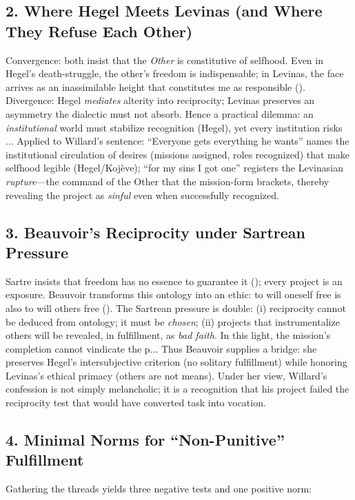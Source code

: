 \documentclass[12pt]{article}
\begin{document}
\subsection*{2. Where Hegel Meets Levinas (and Where They Refuse Each Other)}
Convergence: both insist that the \emph{Other} is constitutive of selfhood. Even in Hegel’s death-struggle, the other’s freedom is indispensable; in Levinas, the face arrives as an inassimilable height that constitutes me as responsible (\parencite{LevinasTI1969}). Divergence: Hegel \emph{mediates} alterity into reciprocity; Levinas preserves an asymmetry the dialectic must not absorb. Hence a practical dilemma: an \emph{institutional} world must stabilize recognition (Hegel), yet every institution risks ...
Applied to Willard’s sentence: ``Everyone gets everything he wants'' names the institutional circulation of desires (missions assigned, roles recognized) that make selfhood legible (Hegel/Koj{\`e}ve); ``for my sins I got one'' registers the Levinasian \emph{rupture}---the command of the Other that the mission-form brackets, thereby revealing the project as \emph{sinful} even when successfully recognized.

\subsection*{3. Beauvoir’s Reciprocity under Sartrean Pressure}
Sartre insists that freedom has no essence to guarantee it (\parencite{SartreBN2003}); every project is an exposure. Beauvoir transforms this ontology into an ethic: to will oneself free is also to will others free (\parencite{Beauvoir1976}). The Sartrean pressure is double: (i) reciprocity cannot be deduced from ontology; it must be \emph{chosen}; (ii) projects that instrumentalize others will be revealed, in fulfillment, as \emph{bad faith}. In this light, the mission’s completion cannot vindicate the p...
Thus Beauvoir supplies a bridge: she preserves Hegel’s intersubjective criterion (no solitary fulfillment) while honoring Levinas’s ethical primacy (others are not means). Under her view, Willard’s confession is not simply melancholic; it is a recognition that his project failed the reciprocity test that would have converted task into vocation.

\subsection*{4. Minimal Norms for ``Non-Punitive'' Fulfillment}
Gathering the threads yields three negative tests and one positive norm:
\end{document}
